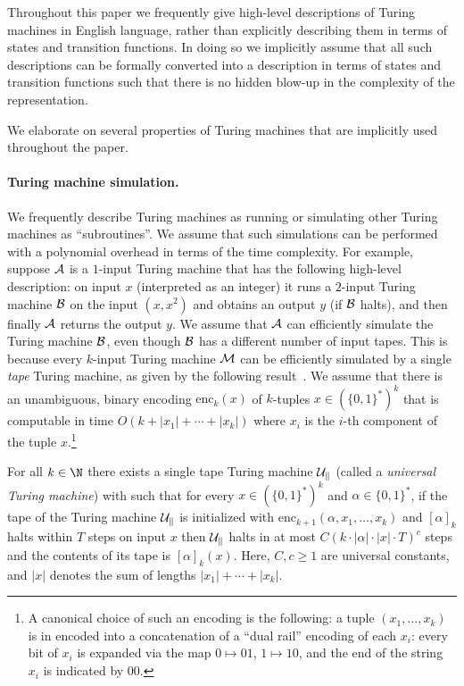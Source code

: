 Throughout this paper we frequently give high-level descriptions of Turing machines in English language, 
rather than explicitly describing them in terms of states and transition functions. In doing so we implicitly assume that all such descriptions can be formally converted into a description in terms of states and transition functions such that there is no hidden blow-up in the complexity of the representation. 




We elaborate on several properties of Turing machines that are implicitly used throughout the paper.


\paragraph{Turing machine simulation.} We frequently describe Turing machines as running or simulating other Turing machines as
``subroutines''. We assume that such simulations can be performed with a polynomial overhead in terms of the time complexity. 
For example, suppose $\cal{A}$ is a $1$-input Turing machine that has the following high-level
description: on input $x$ (interpreted as an integer) it runs a $2$-input Turing machine $\cal{B}$ on the input $(x,x^2)$ and obtains an output $y$ (if $\cal{B}$ halts),
and then finally $\cal{A}$ returns the output $y$. We assume that $\cal{A}$ can efficiently simulate the Turing
machine $\cal{B}$, even though $\cal{B}$ 
has a different number of input tapes. This is because every
$k$-input Turing machine $\cal{M}$ can be efficiently simulated 
by a single \emph{tape} Turing machine, as given by the following result~\cite{hartmanis1965computational}.
We assume that there is an unambiguous, binary encoding
$\mathrm{enc}_k(x)$ of $k$-tuples $x \in (\{0,1\}^*)^k$ that is computable in
time $O(k + |x_1| + \cdots + |x_k|)$ where $x_i$ is the $i$-th component of the
tuple $x$.\footnote{A canonical choice of such an encoding is the following: a
  tuple $(x_1,\ldots,x_k)$ is in encoded into a concatenation of a ``dual rail''
  encoding of each $x_i$: every bit of $x_i$ is expanded via the map $0 \mapsto
  01$, $1 \mapsto 10$, and the end of the string $x_i$ is indicated by $00$.}
 



\begin{theorem}
  \label{thm:universal-tm}
 For all $k \in \N$ there exists a single tape Turing machine $\cal{U}_k$ (called a \emph{universal Turing machine}) with such
  that for every $x \in (\{0,1\}^*)^k$ and $\alpha \in \{0,1\}^*$, if the tape of 
  the Turing machine $\cal{U}_k$ is initialized with $\mathrm{enc}_{k+1}(\alpha,x_1,\ldots,x_k)$ and 
  $[\alpha]_k$ halts within $T$ steps on input $x$ then $\cal{U}_k$ halts in at most $C(k \cdot |\alpha| \cdot |x| \cdot T)^c$ steps and the contents
    of its tape is $[\alpha]_k(x)$. Here, $C, c \geq 1$ are universal constants, and $|x|$ denotes the sum of lengths $|x_1| + \cdots + |x_k|$. 
    
\end{theorem}

